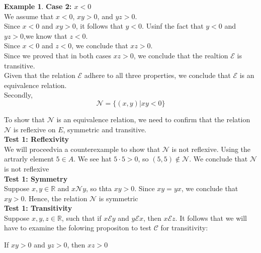 \documentclass{book}
\theoremstyle{definition}
\newtheorem{example}{Example}[definition]
\theoremstyle{remark}
\newcommand{\bb}[1]{\mathbb{#1}}
\newcommand{\cc}[1]{\mathcal{#1}}
\newcommand{\m}{\cdot}
\begin{document}
\begin{example}
                \textbf{Case 2: $x<0$} \\
                    We assume that $x < 0$, $xy > 0$, and $yz >0$. \\
                    Since $x < 0 $ and $xy > 0$, it follows that $y < 0$. Usinf the fact that $y < 0$ and $yz > 0$,we know that $z < 0$. \\
                    Since $x < 0$ and $z < 0$, we conclude that $xz > 0$. \\
                
                Since we proved that in both cases $xz > 0$, we conclude that the realtion $\cc{E}$ is transitive. \\
                
            Given that the relation $\cc{E}$ adhere to all three properties, we conclude that $\cc{E}$ is an equivalence relation. \\
            
            
        Secondly, \\
            \begin{equation*}
                \cc{N} = \{ (x,y) | xy < 0 \}
            \end{equation*}
            
        To show that $\cc{N}$ is an equivalence relation, we need to confirm that the relation $\cc{N}$ is reflexive on $E$, symmetric and transitive. \\
        
            \textbf{Test 1: Reflexivity } \\
                We will proceedvia a counterexample to show that $\cc{N}$ is not reflexive. Using the artrarly element $5 \in A$. We see hat $5 \m 5 > 0$, so $(5,5) \notin \cc{N}$. We conclude that $\cc{N}$ is not reflexive  \\

            \textbf{Test 1: Symmetry } \\
                Suppose $x,y \in \bb{R}$ and $x \cc{N} y$, so thta $xy >0$. Since $xy = yx$, we conclude that $xy > 0$. Hence, the relation $\cc{N}$ is symmetric \\
            
            \textbf{Test 1: Transitivity } \\
                 Suppose $x,y,z \in \bb{R}$, such that if $x \cc{E} y$ and $y \cc{E} x$, then $x \cc{E} z$. It follows that we will have to examine the folowing propositon to test $\cc{C}$ for transitivity:
                    \begin{center}
                        If $xy > 0$ and $yz > 0$, then $xz > 0$
                    \end{center}
                

\end{example}
\end{document}
